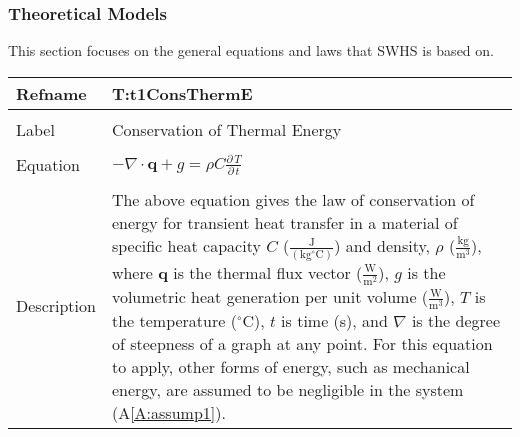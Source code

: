 \documentclass[12pt]{article}
\begin{document}
\subsubsection{Theoretical Models}
\label{Sec:TMs}
This section focuses on the general equations and laws that SWHS is based on.
~\newline
\noindent \begin{minipage}{\textwidth}
\begin{tabular}{p{} p{}}
\toprule \textbf{Refname} & \textbf{T:t1ConsThermE}
\label{T:t1ConsThermE}
\\ \midrule \\
Label & Conservation of Thermal Energy
\\ \midrule \\
Equation & $-\nabla{}\cdot{}\mathbf{q}+g=\rho{} C \frac{\partial{}\,T}{\partial{}\,t}$
\\ \midrule \\
Description & The above equation gives the law of conservation of energy for transient heat transfer in a material of specific heat capacity $C$ ($\frac{\text{J}}{(\text{kg}{}^{\circ}\text{C})}$) and density, $\rho{}$ ($\frac{\text{kg}}{\text{m}^{3}}$), where $\mathbf{q}$ is the thermal flux vector ($\frac{\text{W}}{\text{m}^{2}}$), $g$ is the volumetric heat generation per unit volume ($\frac{\text{W}}{\text{m}^{3}}$), $T$ is the temperature (${}^{\circ}$C), $t$ is time (s), and $\nabla{}$ is the degree of steepness of a graph at any point. For this equation to apply, other forms of energy, such as mechanical energy, are assumed to be negligible in the system (A\ref{A:assump1}).
\\ \bottomrule \end{tabular}
\end{minipage}\\
\end{document}
